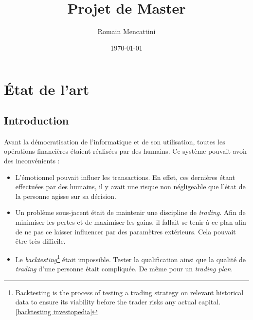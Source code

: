 \documentclass[a4paper, 11pt]{article}
\title{Projet de Master}
\author{Romain Mencattini}
\date{\today}
\begin{document}
\maketitle
\newpage
\tableofcontents
\newpage

\section{État de l'art}
\subsection{Introduction}
\paragraph{}
Avant la démocratisation de l'informatique et de son utilisation, toutes les opérations financières étaient réalisées par des humains. Ce système pouvait avoir des inconvénients :
\begin{itemize}
\item L'émotionnel pouvait influer les transactions. En effet, ces dernières étant effectuées par des humains, il y avait une risque non négligeable que l'état de la personne agisse sur sa décision.
\item Un problème sous-jacent était de maintenir une discipline de \textit{trading}. Afin de minimiser les pertes et de maximiser les gains, il fallait se tenir à ce plan afin de ne pas ce laisser influencer par des paramètres extérieurs. Cela pouvait être très difficile.
\item Le \textit{backtesting}\footnote{Backtesting is the process of testing a trading strategy on relevant historical data to ensure its viability before the trader risks any actual capital. \ref{backtesting investopedia}} était impossible. Tester la qualification ainsi que la qualité de \textit{trading} d'une personne était compliquée. De même pour un \textit{trading plan}.
\end{itemize}
\end{document}
